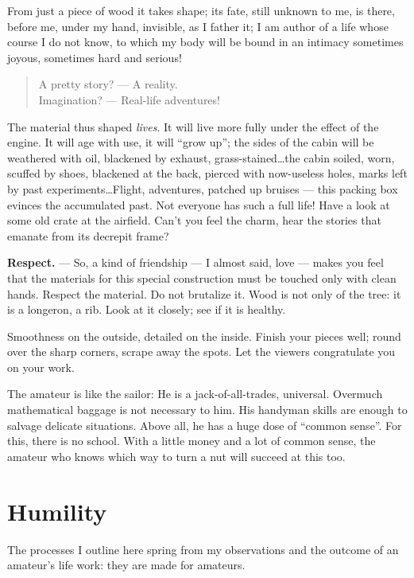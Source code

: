 \documentclass{book}
\begin{document}
From just a piece of wood it takes shape; its fate, still unknown to
me, is there, before me, under my hand, invisible, as I father it; I
am author of a life whose course I do not know, to which my body will
be bound in an intimacy sometimes joyous, sometimes hard and serious!

\begin{verse}
  A pretty story? --- A reality.\\
  Imagination? --- Real-life adventures!
\end{verse}

The material thus shaped \textit{lives}. It will live more fully under
the effect of the engine. It will age with use, it will ``grow up'';
the sides of the cabin will be weathered with oil, blackened by
exhaust, grass-stained\ldots the cabin soiled, worn, scuffed by shoes,
blackened at the back, pierced with now-useless holes, marks left by
past experiments\ldots Flight, adventures, patched up bruises --- this
packing box evinces the accumulated past. Not everyone has such a full
life! Have a look at some old crate at the airfield. Can't you feel
the charm, hear the stories that emanate from its decrepit frame?

\textbf{Respect.} --- So, a kind of friendship --- I almost said, love
--- makes you feel that the materials for this special construction
must be touched only with clean hands. Respect the material. Do not
brutalize it.  Wood is not only of the tree: it is a longeron, a
rib. Look at it closely; see if it is healthy.

Smoothness on the outside, detailed on the inside. Finish your pieces
well; round over the sharp corners, scrape away the spots.  Let the
viewers congratulate you on your work.

The amateur is like the sailor: He is a jack-of-all-trades,
universal. Overmuch mathematical baggage is not necessary to him. His
handyman skills are enough to salvage delicate situations. Above all,
he has a huge dose of ``common sense''. For this, there is no
school. With a little money and a lot of common sense, the amateur who
knows which way to turn a nut will succeed at this too.

\section{Humility}

The processes I outline here spring from my observations and the
outcome of an amateur's life work: they are made for amateurs.
\end{document}

